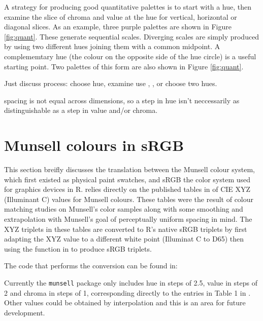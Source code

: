 A strategy for producing good quantitative palettes is to start with a
hue, then examine the slice of chroma and value at the hue for vertical,
horizontal or diagonal slices. As an example, three purple palettes are
shown in Figure \ref{fig:quant}. These generate sequential scales.
Diverging scales are simply produced by using two different hues joining
them with a common midpoint. A complememtary hue (the colour on the
opposite side of the hue circle) is a useful starting point. Two
palettes of this form are also shown in Figure \ref{fig:quant}.

Just discuss process: choose hue, examine  use
, , or choose two hues.

spacing is not equal across dimensions, so a step in hue isn't
neccessarily as distinguishable as a step in value and/or chroma.

\section{Munsell colours in sRGB}\label{munsell-colours-in-srgb}

This section breifly discusses the translation between the Munsell
colour system, which first existed as physical paint swatches, and sRGB
the color system used for graphics devices in R.  relies
directly on the published tables in \citet{Newhall:1943aa} of CIE XYZ
(Illuminant C) values for Munsell colours. These tables were the result
of colour matching studies on Munsell's color samples along with some
smoothing and extrapolation with Munsell's goal of perceptually uniform
spacing in mind. The XYZ triplets in these tables are converted to R's
native sRGB triplets by first adapting the XYZ value to a different
white point (Illuminat C to D65) then using the  function in
 to produce sRGB triplets.

The code that performs the conversion can be found in:

Currently the \texttt{munsell} package only includes hue in steps of
2.5, value in steps of 2 and chroma in steps of 1, corresponding
directly to the entries in Table 1 in \citet{Newhall:1943aa}. Other
values could be obtained by interpolation and this is an area for future
development.

